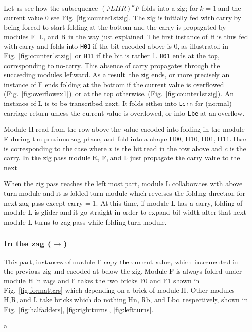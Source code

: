 \documentclass[runningheads]{llncs}
\begin{document}
Let us see how the subsequence $(FLHR)^kF$ folds into a zig; for $k=1$ and the current value 0 see Fig.~\ref{fig:counter1stzig}.
The zig is initially fed with carry by being forced to start folding at the bottom and the carry is propagated by modules F, L, and R in the way just explained.
The first instance of H is thus fed with carry and folds into \texttt{H01} if the bit encoded above is 0, as illustrated in Fig.~\ref{fig:counter1stzig}, or \texttt{H11} if the bit is rather 1.
\texttt{H01} ends at the top, corresponding to no-carry.
This absence of carry propagates through the succeeding modules leftward.
As a result, the zig ends, or more precisely an instance of F ends folding at the bottom if the current value is overflowed (Fig.~\ref{fig:overflowex1}), or at the top otherwise. (Fig.~\ref{fig:counter1stzig}).
An instance of L is to be transcribed next.
It folds either into \texttt{Lcrn} for (normal) carriage-return unless the current value is overflowed, or into \texttt{Lbe} at an overflow.

Module H read from the row above the value encoded into folding in the module F during the previous zag-phase, and fold into a shape H00, H10, H01, H11.
H$xc$ is corresponding to the case where $x$ is the bit read in the row above and $c$ is the carry. 
In the zig pass module R, F, and L just propagate the carry value to the next.

When the zig pass reaches the left most part, module L collaborates with above turn module and it is folded turn module which reverses the folding direction for next zag pass except carry = 1.
At this time, if module L has a carry, folding of module L is glider and it go straight in order to expand bit width after that next module L turns to zag pass while folding turn module.

\subsubsection{In the zag ($\rightarrow$)}
This part, instances of module F copy the current value, which incremented in the previous zig and encoded at below the zig.
Module F is always folded under module H in zags and F takes the two bricks F0 and F1 shown in Fig.~\ref{fig:formatters} which depending on a brick of module H.
Other modules H,R, and L take bricks which do nothing Hn, Rb, and Lbc, respectively, shown in Fig.~\ref{fig:halfadders}, \ref{fig:rightturns}, \ref{fig:leftturns}. 

a
\end{document}
